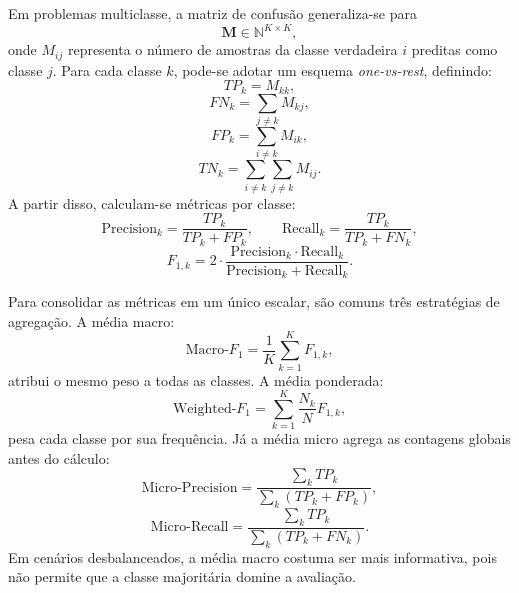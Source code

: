 \documentclass[tcc,capa]{texufpel}
\begin{document}
Em problemas multiclasse, a matriz de confusão generaliza-se para
\begin{equation}
\mathbf{M} \in \mathbb{N}^{K \times K},
\end{equation}
onde $M_{ij}$ representa o número de amostras da classe verdadeira $i$ preditas como classe $j$. Para cada classe $k$, pode-se adotar um esquema \textit{one-vs-rest}, definindo:
\begin{equation}
TP_k = M_{kk},
\end{equation}
\begin{equation}
FN_k = \sum_{j\neq k} M_{kj},
\end{equation}
\begin{equation}
FP_k = \sum_{i\neq k} M_{ik},
\end{equation}
\begin{equation}
TN_k = \sum_{i\neq k}\sum_{j\neq k} M_{ij}.
\end{equation}
A partir disso, calculam-se métricas por classe:
\begin{equation}
\mathrm{Precision}_k = \frac{TP_k}{TP_k + FP_k},
\qquad
\mathrm{Recall}_k = \frac{TP_k}{TP_k + FN_k},
\end{equation}
\begin{equation}
F_{1,k}
=
2\cdot
\frac{\mathrm{Precision}_k \cdot \mathrm{Recall}_k}
{\mathrm{Precision}_k + \mathrm{Recall}_k}.
\end{equation}

Para consolidar as métricas em um único escalar, são comuns três estratégias de agregação. A média macro:
\begin{equation}
\mathrm{Macro}\text{-}F_1
=
\frac{1}{K}\sum_{k=1}^{K} F_{1,k},
\end{equation}
atribui o mesmo peso a todas as classes. A média ponderada:
\begin{equation}
\mathrm{Weighted}\text{-}F_1
=
\sum_{k=1}^{K} \frac{N_k}{N} F_{1,k},
\end{equation}
pesa cada classe por sua frequência. Já a média micro agrega as contagens globais antes do cálculo:
\begin{equation}
\mathrm{Micro}\text{-}\mathrm{Precision}
=
\frac{\sum_{k} TP_k}{\sum_{k}(TP_k+FP_k)},
\end{equation}
\begin{equation}
\mathrm{Micro}\text{-}\mathrm{Recall}
=
\frac{\sum_{k} TP_k}{\sum_{k}(TP_k+FN_k)}.
\end{equation}
Em cenários desbalanceados, a média macro costuma ser mais informativa, pois não permite que a classe majoritária domine a avaliação.
\end{document}
